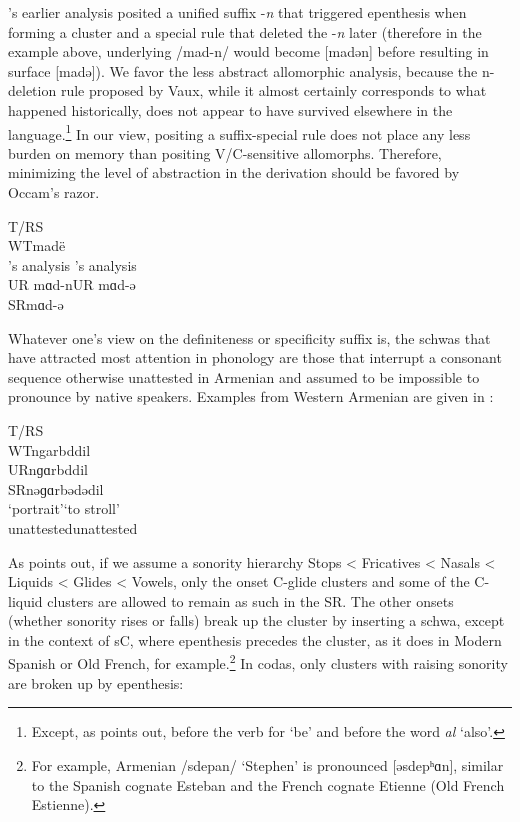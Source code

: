 \documentclass[output=paper,colorlinks,citecolor=brown]{langscibook}
\begin{document}
\citet{Vaux1998}’s earlier analysis posited a unified suffix -\textit{n} that triggered epenthesis when forming a cluster and a special rule that deleted the -\textit{n} later (therefore in the example above, underlying /mad-n/ would become [madən] before resulting in surface [madə]).  We favor the less abstract allomorphic analysis, because the n-deletion rule proposed by Vaux, while it almost certainly corresponds to what happened historically, does not appear to have survived elsewhere in the language.\footnote{Except, as \citet{Baronian2017} points out, before the verb for ‘be’ and before the word \textit{al} ‘also’.}  In our view, positing a suffix-special rule does not place any less burden on memory than positing V/C-sensitive allomorphs. Therefore, minimizing the level of abstraction in the derivation should be favored by Occam’s razor.

\begin{exe}
    \ex  \tab T/RS\tab   {} \\
    \tab \tab  WT\tab madë\tab \\
    \citeauthor{vaux03}’s analysis \tab \tab  \citeauthor{Baronian2017}’s analysis\\
    UR mɑd-n\tab \tab \tab UR mɑd-ə\\
    \tab \tab  SR\tab mɑd-ə\tab 
    
\end{exe}

Whatever one’s view on the definiteness or specificity suffix is, the schwas that have attracted most attention in phonology are those that interrupt a consonant sequence otherwise unattested in Armenian and assumed to be impossible to pronounce by native speakers.  Examples from Western Armenian are given in :

\begin{exe}
    \ex \label{baronian:ex7} T/RS\tab	{}\tab	\tab		{}\\
	WT\tab	ngar\tab		\tab	bddil\\
UR\tab	nɡɑr\tab			\tab bddil\\
SR\tab	nəɡɑr\tab		\tab	bədədil\\
\tab \tab ‘portrait’\tab	\tab		‘to stroll’\\
\tab \tab *[nɡ…] unattested\tab	*[bdd…] unattested

\end{exe}

As \citet{Baronian2017} points out, if we assume a sonority hierarchy Stops < Fricatives < Nasals < Liquids < Glides < Vowels, only the onset C-glide clusters and some of the C-liquid clusters are allowed to remain as such in the SR.  The other onsets (whether sonority rises or falls) break up the cluster by inserting a schwa, except in the context of sC, where epenthesis precedes the cluster, as it does in Modern Spanish or Old French, for example.\footnote{For example, Armenian  /sdepan/ ‘Stephen’ is pronounced [əsdepʰɑn], similar to the Spanish cognate Esteban and the French cognate Etienne (Old French Estienne).}  In codas, only clusters with raising sonority are broken up by epenthesis:
\end{document}
